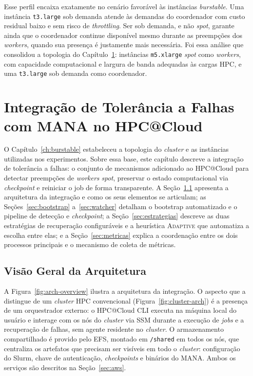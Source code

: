 Esse perfil encaixa exatamente no cenário favorável às instâncias \textit{burstable}. Uma
instância \texttt{t3.large} sob demanda atende às demandas do coordenador com custo residual
baixo e sem risco de \textit{throttling}. Ser sob demanda, e não \textit{spot}, garante
ainda que o coordenador continue disponível mesmo durante as preempções dos \textit{workers},
quando sua presença é justamente mais necessária. Foi essa análise que consolidou a topologia
do Capítulo~\ref{ch:implementacao}: instâncias \texttt{m5.xlarge} \textit{spot} como
\textit{workers}, com capacidade computacional e largura de banda adequadas às cargas HPC, e
uma \texttt{t3.large} sob demanda como coordenador.


\chapter{Integração de Tolerância a Falhas com MANA no HPC@Cloud}
\label{ch:implementacao}

O Capítulo~\ref{ch:burstable} estabeleceu a topologia do \textit{cluster} e as instâncias utilizadas nos experimentos. Sobre essa base, este capítulo descreve a integração de tolerância a falhas: o conjunto de mecanismos adicionado ao HPC@Cloud para detectar preempções de \textit{workers} \textit{spot}, preservar o estado computacional via \textit{checkpoint} e reiniciar o job de forma transparente. A Seção~\ref{sec:visao-geral} apresenta a arquitetura da integração e como os seus elementos se articulam; as Seções~\ref{sec:bootstrap} a~\ref{sec:watcher} detalham o bootstrap automatizado e o pipeline de detecção e \textit{checkpoint}; a Seção~\ref{sec:estrategias} descreve as duas estratégias de recuperação configuráveis e a heurística \textsc{Adaptive} que automatiza a escolha entre elas; e a Seção~\ref{sec:metricas} explica a coordenação entre os dois processos principais e o mecanismo de coleta de métricas.

\section{Visão Geral da Arquitetura}
\label{sec:visao-geral}

A Figura~\ref{fig:arch-overview} ilustra a arquitetura da integração. O aspecto que a distingue de um \textit{cluster} HPC convencional (Figura~\ref{fig:cluster-arch}) é a presença de um orquestrador externo: o HPC@Cloud CLI executa na máquina local do usuário e interage com os nós do \textit{cluster} via SSM durante a execução de \textit{jobs} e a recuperação de falhas, sem agente residente no \textit{cluster}. O armazenamento compartilhado é provido pelo EFS, montado em \texttt{/shared} em todos os nós, que centraliza os artefatos que precisam ser visíveis em todo o \textit{cluster}: configuração do Slurm, chave de autenticação, \textit{checkpoints} e binários do MANA. Ambos os serviços são descritos na Seção~\ref{sec:aws}.

